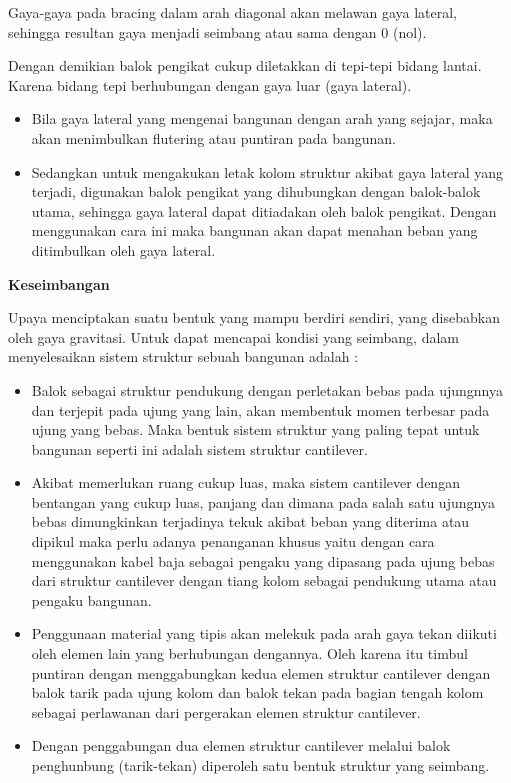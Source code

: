 \documentclass[../main.tex]{subfiles}
\begin{document}
Gaya-gaya pada bracing dalam arah diagonal akan melawan gaya lateral, sehingga resultan gaya menjadi seimbang atau sama dengan 0 (nol).

Dengan demikian balok pengikat cukup diletakkan di tepi-tepi bidang lantai. Karena bidang tepi berhubungan dengan gaya luar (gaya lateral).

\begin{itemize}
	\item Bila gaya lateral yang mengenai bangunan dengan arah yang sejajar, maka akan menimbulkan flutering atau puntiran pada bangunan.
	\item Sedangkan untuk mengakukan letak kolom struktur akibat gaya lateral yang terjadi, digunakan balok pengikat yang dihubungkan dengan balok-balok utama, sehingga gaya lateral dapat ditiadakan oleh balok pengikat. Dengan menggunakan cara ini maka bangunan akan dapat menahan beban yang ditimbulkan oleh gaya lateral.
\end{itemize}

\textbf{Keseimbangan}

Upaya menciptakan suatu bentuk yang mampu berdiri sendiri, yang disebabkan oleh gaya gravitasi. Untuk dapat mencapai kondisi yang seimbang, dalam menyelesaikan sistem struktur sebuah bangunan adalah :

\begin{itemize}
	\item Balok sebagai struktur pendukung dengan perletakan bebas pada ujungnnya dan terjepit pada ujung yang lain, akan membentuk momen terbesar pada ujung yang bebas. Maka bentuk sistem struktur yang paling tepat untuk bangunan seperti ini adalah sistem struktur cantilever.
	\item Akibat memerlukan ruang cukup luas, maka sistem cantilever dengan bentangan yang cukup luas, panjang dan dimana pada salah satu ujungnya bebas dimungkinkan terjadinya tekuk akibat beban yang diterima atau dipikul maka perlu adanya penanganan khusus yaitu dengan cara menggunakan kabel baja sebagai pengaku yang dipasang pada ujung bebas dari struktur cantilever dengan tiang kolom sebagai pendukung utama atau pengaku bangunan.
	\item Penggunaan material yang tipis akan melekuk pada arah gaya tekan diikuti oleh elemen lain yang berhubungan dengannya. Oleh karena itu timbul puntiran dengan menggabungkan kedua elemen struktur cantilever dengan balok tarik pada ujung kolom dan balok tekan pada bagian tengah kolom sebagai perlawanan dari pergerakan elemen struktur cantilever.
	\item Dengan penggabungan dua elemen struktur cantilever melalui balok penghunbung (tarik-tekan) diperoleh satu bentuk struktur yang seimbang.
\end{itemize}
\end{document}
